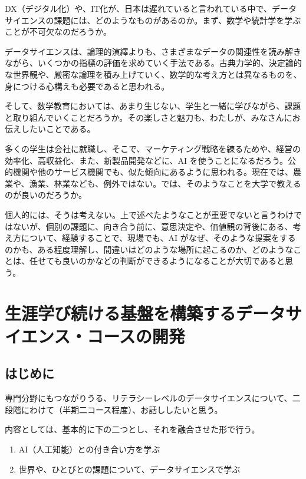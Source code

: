 \documentclass[
]{bxjsbook}
\providecommand{\tightlist}{%
  \setlength{\itemsep}{0pt}\setlength{\parskip}{0pt}}
\theoremstyle{definition}
\theoremstyle{definition}
\theoremstyle{definition}
\theoremstyle{definition}
\theoremstyle{remark}
\begin{document}
DX（デジタル化）や、IT化が、日本は遅れていると言われている中で、データサイエンスの課題には、どのようなものがあるのか。まず、数学や統計学を学ぶことが不可欠なのだろうか。

データサイエンスは、論理的演繹よりも、さまざまなデータの関連性を読み解きながら、いくつかの指標の評価を求めていく手法である。古典力学的、決定論的な世界観や、厳密な論理を積み上げていく、数学的な考え方とは異なるものを、身につける心構えも必要であると思われる。

そして、数学教育においては、あまり生じない、学生と一緒に学びながら、課題と取り組んでいくことだろうか。その楽しさと魅力も、わたしが、みなさんにお伝えしたいことである。

多くの学生は会社に就職し、そこで、マーケティング戦略を練るためや、経営の効率化、高収益化、また、新製品開発などに、AI を使うことになるだろう。公的機関や他のサービス機関でも、似た傾向にあるように思われる。現在では、農業や、漁業、林業なども、例外ではない。では、そのようなことを大学で教えるのが良いのだろうか。

個人的には、そうは考えない。上で述べたようなことが重要でないと言うわけではないが、個別の課題に、向き合う前に、意思決定や、価値観の背後にある、考え方について、経験することで、現場でも、AI がなぜ、そのような提案をするのかも、ある程度理解し、間違いはどのような場所に起こるのか、どのようなことは、任せても良いのかなどの判断ができるようになることが大切であると思う。

\hypertarget{coursedesign}{%
\section{生涯学び続ける基盤を構築するデータサイエンス・コースの開発}\label{coursedesign}}

\hypertarget{ux306fux3058ux3081ux306b-1}{%
\subsection{はじめに}\label{ux306fux3058ux3081ux306b-1}}

専門分野にもつながりうる、リテラシーレベルのデータサイエンスについて、二段階にわけて（半期二コース程度）、お話ししたいと思う。

内容としては、基本的に下の二つとし、それを融合させた形で行う。

\begin{enumerate}
\def\labelenumi{\arabic{enumi}.}
\tightlist
\item
  AI（人工知能）との付き合い方を学ぶ
\item
  世界や、ひとびとの課題について、データサイエンスで学ぶ
\end{enumerate}
\end{document}
